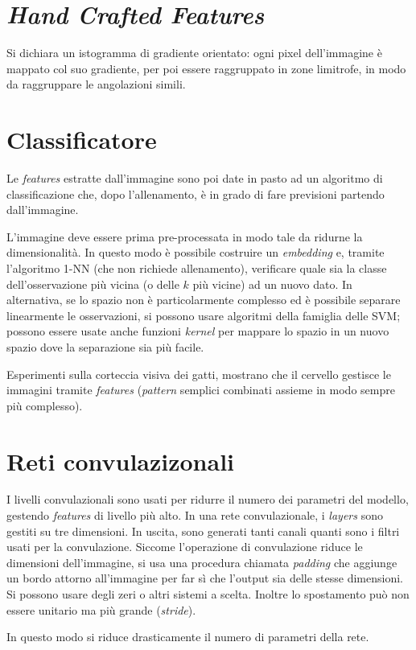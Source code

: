 \documentclass[11pt, a4page]{article}
\begin{document}
\section{\textit{Hand Crafted Features}}
Si dichiara un istogramma di gradiente orientato: ogni pixel dell'immagine è mappato col suo gradiente, per poi essere raggruppato in zone limitrofe, in modo da raggruppare le angolazioni simili.

\section{Classificatore}
Le \textit{features} estratte dall'immagine sono poi date in pasto ad un algoritmo di classificazione che, dopo l'allenamento, è in grado di fare previsioni partendo dall'immagine.

L'immagine deve essere prima pre-processata in modo tale da ridurne la dimensionalità.
In questo modo è possibile costruire un \textit{embedding} e, tramite l'algoritmo 1-NN (che non richiede allenamento), verificare quale sia la classe dell'osservazione più vicina (o delle $k$ più vicine) ad un nuovo dato.
In alternativa, se lo spazio non è particolarmente complesso ed è possibile separare linearmente le osservazioni, si possono usare algoritmi della famiglia delle SVM; possono essere usate anche funzioni \textit{kernel} per mappare lo spazio in un nuovo spazio dove la separazione sia più facile.

Esperimenti sulla corteccia visiva dei gatti, mostrano che il cervello gestisce le immagini tramite \textit{features} (\textit{pattern} semplici combinati assieme in modo sempre più complesso).

\section{Reti convulazizonali}
I livelli convulazionali sono usati per ridurre il numero dei parametri del modello, gestendo \textit{features} di livello più alto.
In una rete convulazionale, i \textit{layers} sono gestiti su tre dimensioni.
In uscita, sono generati tanti canali quanti sono i filtri usati per la convulazione.
Siccome l'operazione di convulazione riduce le dimensioni dell'immagine, si usa una procedura chiamata \textit{padding} che aggiunge un bordo attorno all'immagine per far sì che l'output sia delle stesse dimensioni.
Si possono usare degli zeri o altri sistemi a scelta.
Inoltre lo spostamento può non essere unitario ma più grande (\textit{stride}).

In questo modo si riduce drasticamente il numero di parametri della rete.
\end{document}
